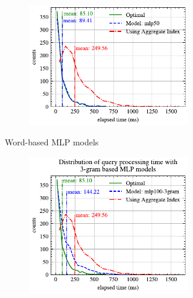 \begin{figure}[!th]
\begin{subfigure}{0.45\textwidth}
\begin{subfigure}{\textwidth}
		\end{subfigure}
		\vfill
		\begin{subfigure}{\textwidth}
			\centering
%			
			\includegraphics[]{my/graphics/perf_dist_mlp50_A.pdf}
		\end{subfigure}
		\caption{Word-based MLP models}
	\end{subfigure}
	\hfill
	\begin{subfigure}{0.45\textwidth}
		\begin{subfigure}{\textwidth}
			\centering
%			
			\includegraphics[]{my/graphics/perf_dist_mlp100_3gram_A.pdf}
		\end{subfigure}
		\vfill

\end{subfigure}
\end{figure}
